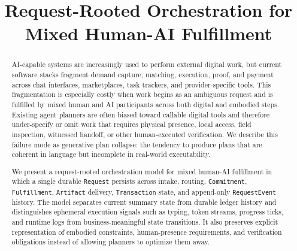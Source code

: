 \documentclass[10pt,conference]{IEEEtran}
\title{Request-Rooted Orchestration for Mixed Human-AI Fulfillment}
\author{
\IEEEauthorblockN{Draft Manuscript}
\IEEEauthorblockA{Boreal Network}
}
\begin{document}
\maketitle

\begin{abstract}
AI-capable systems are increasingly used to perform external digital work, but current software stacks fragment demand capture, matching, execution, proof, and payment across chat interfaces, marketplaces, task trackers, and provider-specific tools. This fragmentation is especially costly when work begins as an ambiguous request and is fulfilled by mixed human and AI participants across both digital and embodied steps. Existing agent planners are often biased toward callable digital tools and therefore under-specify or omit work that requires physical presence, local access, field inspection, witnessed handoff, or other human-executed verification. We describe this failure mode as generative plan collapse: the tendency to produce plans that are coherent in language but incomplete in real-world executability.

We present a request-rooted orchestration model for mixed human-AI fulfillment in which a single durable \texttt{Request} persists across intake, routing, \texttt{Commitment}, \texttt{Fulfillment}, \texttt{Artifact} delivery, \texttt{Transaction} state, and append-only \texttt{RequestEvent} history. The model separates current summary state from durable ledger history and distinguishes ephemeral execution signals such as typing, token streams, progress ticks, and runtime logs from business-meaningful state transitions. It also preserves explicit representation of embodied constraints, human-presence requirements, and verification obligations instead of allowing planners to optimize them away.


\end{abstract}
\end{document}
